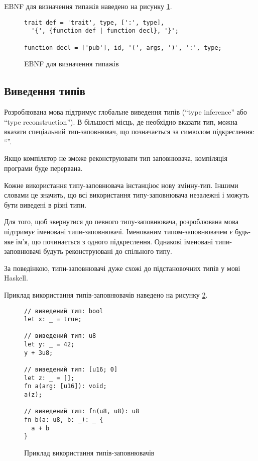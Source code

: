 \documentclass[main.tex]{subfiles}
\begin{document}
EBNF для визначення типажів наведено на рисунку \ref{ebnf:trait}.

\begin{figure}[h]
  \centering
  \begin{verbatim}
trait def = 'trait', type, [':', type],
  '{', {function def | function decl}, '}';

function decl = ['pub'], id, '(', args, ')', ':', type;
  \end{verbatim}
  \caption{EBNF для визначення типажів}
  \label{ebnf:trait}
\end{figure}

\FloatBarrier
\subsection{Виведення типів}
Розроблювана мова підтримує глобальне виведення типів (``type inference'' або ``type reconstruction'').
В більшості місць, де необхідно вказати тип, можна вказати спеціальний тип-заповнювач, що позначається за символом підкреслення: ``\code{\_}''.

Якщо компілятор не зможе реконструювати тип заповнювача, компіляція програми буде перервана.

Кожне використання типу-заповнювача інстанціює нову змінну-тип. Іншими словами це значить, що всі використання типу-заповнювача незалежні і можуть бути виведені в різні типи.

Для того, щоб звернутися до певного типу-заповнювача, розроблювана мова підтримує іменовані типи-заповнювачі.
Іменованим типом-заповнювачем є будь-яке ім'я, що починається з одного підкреслення.
Однакові іменовані типи-заповнювачі будуть реконструювані до спільного типу.

За поведінкою, типи-заповнювачі дуже схожі до підстановочних типів у мові Haskell\cite{haskell:type-wildcards}.

Приклад використання типів-заповнювачів наведено на рисунку \ref{lang:type-placeholder}.

\begin{figure}[h]
  \centering
  \begin{verbatim}
// виведений тип: bool
let x: _ = true;

// виведений тип: u8
let y: _ = 42;
y + 3u8;

// виведений тип: [u16; 0]
let z: _ = [];
fn a(arg: [u16]): void;
a(z);

// виведений тип: fn(u8, u8): u8
fn b(a: u8, b: _): _ {
  a + b
}
  \end{verbatim}
  \caption{Приклад використання типів-заповнювачів}
  \label{lang:type-placeholder}
\end{figure}
\end{document}
